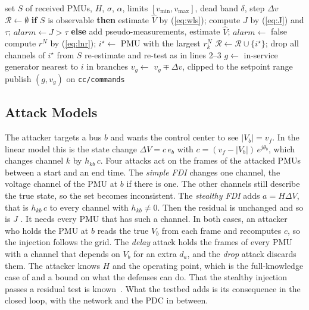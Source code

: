 \documentclass[journal]{IEEEtran}
\begin{document}
\begin{algorithm}[t]
\caption{Control center, one PDC set}
\label{alg:cc}
\begin{algorithmic}[1]
\Require set $S$ of received PMUs, $H$, $\sigma$, $\alpha$, limits $[v_{\min}, v_{\max}]$, dead band $\delta$, step $\Delta v$
\State $\mathcal{R} \gets \emptyset$ 
\State \textbf{if} $S$ is observable \textbf{then} estimate $\hat V$ by (\ref{eq:wls}); compute $J$ by (\ref{eq:J}) and $\tau$; $\mathit{alarm} \gets J > \tau$
\State \textbf{else} add pseudo-measurements, estimate $\hat V$; $\mathit{alarm} \gets$ false 
  \State compute $r^N$ by (\ref{eq:lnr}); $i^\star \gets$ PMU with the largest $r^N_k$
  \State $\mathcal{R} \gets \mathcal{R} \cup \{i^\star\}$; drop all channels of $i^\star$ from $S$
  \State re-estimate and re-test as in lines 2--3
\EndWhile
{} \State \Return {} \EndIf
{}
  \State $g \gets$ in-service generator nearest to $i$ in branches
    \State $v_g \gets$ $v_g \mp \Delta v$, clipped to the setpoint range
    \State publish $(g, v_g)$ on \texttt{cc/commands}
  \EndIf
\EndFor
\end{algorithmic}
\end{algorithm}

\subsection{Attack Models}
\label{sec:attacks}

The attacker targets a bus $b$ and wants the control center to see $|V_b| = v_f$. In the linear model this is the state change $\Delta V = c\,e_b$ with $c = (v_f - |V_b|)\,e^{j\theta_b}$, which changes channel $k$ by $h_{kb}\,c$. Four attacks act on the frames of the attacked PMUs between a start and an end time. The \emph{simple FDI} changes one channel, the voltage channel of the PMU at $b$ if there is one. The other channels still describe the true state, so the set becomes inconsistent. The \emph{stealthy FDI} adds $a = H\Delta V$, that is $h_{kb}\,c$ to every channel with $h_{kb} \ne 0$. Then the residual is unchanged and so is $J$ \cite{liu2009fdi}. It needs every PMU that has such a channel. In both cases, an attacker who holds the PMU at $b$ reads the true $V_b$ from each frame and recomputes $c$, so the injection follows the grid. The \emph{delay} attack holds the frames of every PMU with a channel that depends on $V_b$ for an extra $d_a$, and the \emph{drop} attack discards them. The attacker knows $H$ and the operating point, which is the full-knowledge case of \cite{liu2009fdi} and a bound on what the defenses can do. That the stealthy injection passes a residual test is known~\cite{liu2009fdi}. What the testbed adds is its consequence in the closed loop, with the network and the PDC in between.
\end{document}
